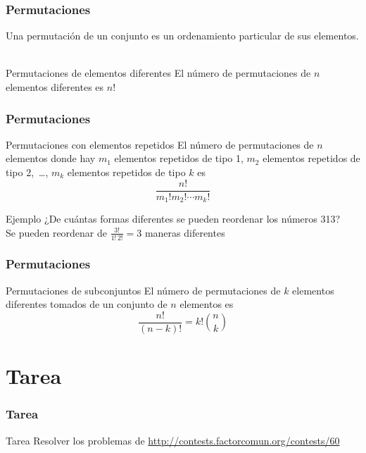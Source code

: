 \documentclass{beamer}
\begin{document}
	\begin{frame}
		\frametitle{Permutaciones}
		Una permutación de un conjunto es un ordenamiento particular de sus elementos.
		\quad \\ \quad \\
		\begin{block}{Permutaciones de elementos diferentes}
			El número de permutaciones de $n$ elementos diferentes es $n!$
		\end{block}
	\end{frame}
	
	\begin{frame}
		\frametitle{Permutaciones}
		
		\begin{block}{Permutaciones con elementos repetidos}
			El número de permutaciones de $n$ elementos donde hay $m_1$ elementos repetidos de tipo 1, $m_2$ elementos repetidos de tipo 2,~\ldots, $m_k$ elementos repetidos de tipo $k$ es
			$$ \frac{n!}{m_1! m_2! \cdots m_k!} $$
		\end{block}
		
		\begin{exampleblock}{Ejemplo}
			¿De cuántas formas diferentes se pueden reordenar los números 313?\\
			\pause
			Se pueden reordenar de $\displaystyle\frac{3!}{1!\,2!} = 3 $ maneras diferentes
		\end{exampleblock}
	\end{frame}

	\begin{frame}
		\frametitle{Permutaciones}
		\begin{block}{Permutaciones de subconjuntos}
			El número de permutaciones de $k$ elementos diferentes tomados de un conjunto de $n$ elementos es
			$$ \frac{n!}{(n-k)!} = k! \binom{n}{k}$$
		\end{block}
	\end{frame}


\section{Tarea}
	\begin{frame}[fragile]
		\frametitle{Tarea}
		\begin{alertblock}{Tarea}
			Resolver los problemas de \url{http://contests.factorcomun.org/contests/60}
		\end{alertblock}
	\end{frame}
\end{document}

